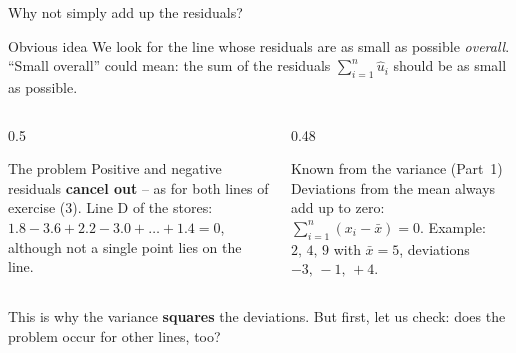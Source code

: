 \documentclass[aspectratio=169,11pt]{beamer}
\begin{document}
\begin{frame}{Why not simply add up the residuals?}
  \begin{block}{Obvious idea}
    We look for the line whose residuals are as small as possible
    \emph{overall}. ``Small overall'' could mean: the sum of the residuals
    $\sum_{i=1}^{n} \hat{u}_i$ should be as small as possible.
  \end{block}

  \begin{columns}[T]
    \begin{column}{0.5\textwidth}
      \begin{alertblock}{The problem}
        Positive and negative residuals \textbf{cancel out} -- as for both
        lines of exercise (3). Line D of the stores:
        $1.8 - 3.6 + 2.2 - 3.0 + \ldots + 1.4 = 0$, although not a single
        point lies on the line.
      \end{alertblock}
    \end{column}
    \begin{column}{0.48\textwidth}
      \begin{exampleblock}{Known from the variance (Part~1)}
        Deviations from the mean always add up to zero:
        $\sum_{i=1}^{n} (x_i - \bar{x}) = 0$.
        Example: $2,\,4,\,9$ with $\bar{x} = 5$, deviations $-3,\,-1,\,+4$.
      \end{exampleblock}
    \end{column}
  \end{columns}

  \medskip
  This is why the variance \textbf{squares} the deviations. But first, let us
  check: does the problem occur for other lines, too?
\end{frame}
\end{document}
